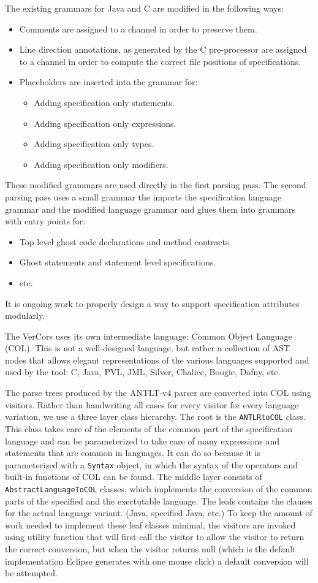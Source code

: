 \documentclass{report}
\begin{document}
The existing grammars for Java and C are modified in the following ways:
\begin{itemize}
\item Comments are assigned to a channel in order to preserve them.
\item Line direction annotations, as generated by the C pre-processor are
assigned to a channel in order to compute the correct file positions of specifications.
\item Placeholders are inserted into the grammar for:
\begin{itemize}
\item Adding specification only statements.
\item Adding specification only expressions.
\item Adding specification only types.
\item Adding specification only modifiers.
\end{itemize}
\end{itemize}
These modified grammars are used directly in the first parsing pass.
The second parsing pass uses a small grammar the imports the specification language grammar
and the modified language grammar and glues them into grammars
with entry points for:
\begin{itemize}
\item Top level ghost code declarations and method contracts.
\item Ghost statements and statement level specifications.
\item etc.
\end{itemize}
It is ongoing work to properly design a way to support specification attributes modularly.

The VerCors uses its own intermediate language: Common Object Language (COL).
This is not a well-designed language, but rather a collection of AST nodes
that allows elegant representations of the various languages supported and
used by the tool: C, Java, PVL, JML, Silver, Chalice, Boogie, Dafny, etc.

The parse trees produced by the ANTLT-v4 parser are converted into COL
using visitors. Rather than handwriting all cases for every visitor
for every language variation, we use a three layer class hierarchy.
The root is the \lstinline+ANTLRtoCOL+ class. This class takes care
of the elements of the common part of the specification language
and can be parameterized to take care of many expressions and
statements that are common in languages. It can do so because 
it is parameterized with a \lstinline+Syntax+ object, in which the 
syntax of the operators and built-in functions of COL can be found.
The middle layer consists of \lstinline+AbstractLanguageToCOL+ classes,
which implements the conversion of the common parts of the specified and
the exectutable language. The leafs contains the clauses for the actual language variant.
(Java, specified Java, etc.) To keep the amount of work needed to implement
these leaf classes minimal, the visitors are invoked using utility function that
will first call the visitor to allow the visitor to return the correct conversion,
but when the visitor returns null (which is the default implementation Eclipse generates
with one mouse click) a default conversion will be attempted.
\end{document}
